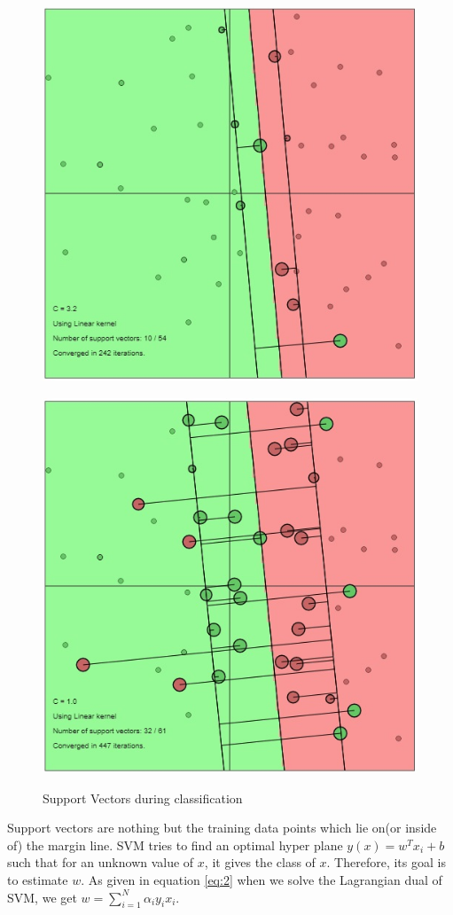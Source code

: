 {\begin{figure}
	\begin{minipage}{\linewidth}
		\centering\captionsetup[subfigure]{justification=centering}
		\includegraphics[height=0.6\linewidth, width=0.65\linewidth]{Exercise1/Report/lin_SV1.jpg}
		\label{fig:SV1}\par\vfill
		\includegraphics[height=0.6\linewidth, width=0.65\linewidth]{Exercise1/Report/lin_SV2.jpg}
		\label{fig:SV2}
	\end{minipage}
	\caption{Support Vectors during classification}
	\label{fig:SV}
\end{figure}
Support vectors are nothing but the training data points which lie on(or inside of) the margin line. SVM tries to find an optimal hyper plane $y(x) = w^Tx_i+b$ such that for an unknown value of $x$, it gives the class of $x$. Therefore, its goal is to estimate $w$. As given in equation \ref{eq:2} when we solve the Lagrangian dual of SVM, we get $w = \sum_{i=1}^{N} \alpha_i y_i x_i $. 
}

